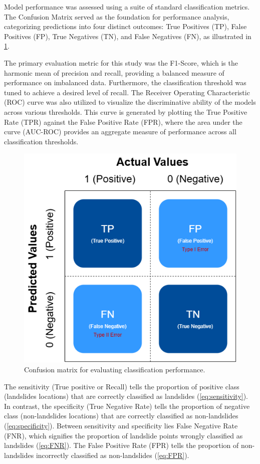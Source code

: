 Model performance was assessed using a suite of standard classification metrics. The Confusion Matrix served as the foundation for performance analysis\cite{mthd09}, categorizing predictions into four distinct outcomes: True Positives (TP), False Positives (FP), True Negatives (TN), and False Negatives (FN), as illustrated in \ref{fig}.

The primary evaluation metric for this study was the F1-Score, which is the harmonic mean of precision and recall, providing a balanced measure of performance on imbalanced data. Furthermore, the classification threshold was tuned to achieve a desired level of recall. The Receiver Operating Characteristic (ROC) curve was also utilized to visualize the discriminative ability of the models across various thresholds. This curve is generated by plotting the True Positive Rate (TPR) against the False Positive Rate (FPR), where the area under the curve (AUC-ROC) provides an aggregate measure of performance across all classification thresholds.
\begin{figure}[H]
    \centerline{\includegraphics[width=\linewidth]{fig5.png}}
    \caption{Confusion matrix for evaluating classification performance.}
    \label{fig}
\end{figure}

The sensitivity (True positive or Recall) tells the proportion of positive class (landslides locations) that are correctly classified as landslides (\ref{eq:sensitivity}). In contrast, the specificity (True Negative Rate) tells the proportion of negative class (non-landslides locations) that are correctly classified as non-landslides (\ref{eq:specificity}). Between sensitivity and specificity lies False Negative Rate (FNR), which signifies the proportion of landslide points wrongly classified as landslides (\ref{eq:FNR}). The False Positive Rate (FPR) tells the proportion of non-landslides incorrectly classified as non-landslides (\ref{eq:FPR}).

